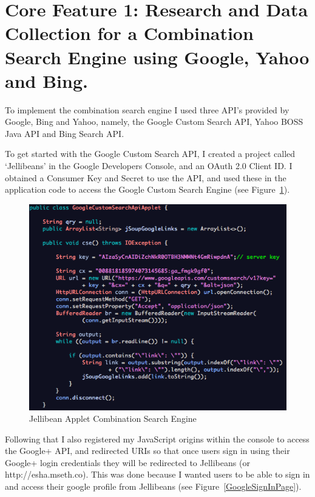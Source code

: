 \documentclass[a4paper, 11pt]{article}
\begin{document}
\section{Core Feature 1: Research and Data Collection for a Combination Search Engine using Google, Yahoo and Bing.}

To implement the combination search engine I used three API’s provided by Google, Bing and Yahoo, namely, the Google Custom Search API, Yahoo BOSS Java API and Bing Search API. 

To get started with the Google Custom Search API, I created a project called ‘Jellibeans’ in the Google Developers Console, and an OAuth 2.0 Client ID. I obtained a Consumer Key and Secret to use the API, and used these in the application code to access the Google Custom Search Engine (see Figure~\ref{JBeanAppletGoogleCustomSearch1}). 

\begin{figure}[H]
\begin{center}
\includegraphics[scale=0.7]{JBeanAppletGoogleCustomSearch}
\end{center}

\caption{Jellibean Applet Combination Search Engine}
\label{JBeanAppletGoogleCustomSearch1}
\end{figure}

Following that I also registered my JavaScript origins within the console to access the Google+ API, and redirected URIs so that once users sign in using their Google+ login credentials they will be redirected to Jellibeans (or http://esha.mseth.co). This was done because I wanted users to be able to sign in and access their google profile from Jellibeans (see Figure~\ref{GoogleSignInPage}). 
\end{document}
